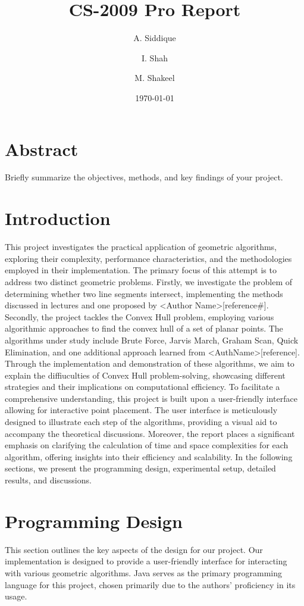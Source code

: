 \documentclass[10pt,twocolumn]{article}
\title{CS-2009 Pro Report}
\author{A. Siddique \and I. Shah \and M. Shakeel}
\date{\today}
\begin{document}
\maketitle

\section*{Abstract}
Briefly summarize the objectives, methods, and key findings of your project.

\section*{Introduction}
This project investigates the practical application of geometric algorithms,
exploring their complexity, performance characteristics, and the methodologies employed in their implementation.
The primary focus of this attempt is to address two distinct geometric problems. Firstly, we investigate the problem of
determining whether two line segments intersect, implementing the methods discussed in lectures and one proposed by <Author Name>[reference#].
Secondly, the project tackles the Convex Hull problem, employing various algorithmic approaches to find the convex hull of a set
of planar points. The algorithms under study include Brute Force, Jarvis March, Graham Scan, Quick Elimination, and one
additional approach learned from <AuthName>[reference]. Through the implementation and demonstration of these algorithms, we
aim to explain the diffiuculties of Convex Hull problem-solving, showcasing different strategies and their implications on computational efficiency.
To facilitate a comprehensive understanding, this project is built upon a user-friendly interface allowing for interactive point
placement. The user interface is meticulously designed to illustrate each step of the algorithms,
providing a visual aid to accompany the theoretical discussions. Moreover, the report places a significant emphasis on clarifying
the calculation of time and space complexities for each algorithm, offering insights into their efficiency and scalability.
In the following sections, we present the programming design, experimental setup, detailed results, and discussions.

\section*{Programming Design}

This section outlines the key aspects of the design for our project. Our implementation is designed to provide a user-friendly interface for 
interacting with various geometric algorithms. Java serves as the primary programming language for this project, 
chosen primarily due to the authors' proficiency in its usage.
\end{document}
